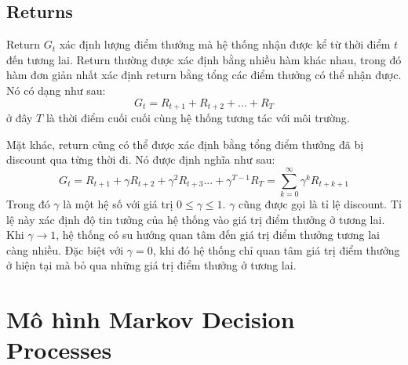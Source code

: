 \subsection{Returns}
Return $\mathit{G_t}$ xác định lượng điểm thưởng mà hệ thống nhận được kể từ thời điểm $t$ đến tương lai. Return thường được xác định bằng nhiều hàm khác nhau, trong đó hàm đơn giản nhất xác định return bằng tổng các điểm thưởng có thể nhận được. Nó có dạng như sau:
\begin{equation}
\mathit{G_t} = \mathit{R_{t+1}} + \mathit{R_{t+2}} + ... + \mathit{R_{T}}
\end{equation}	
ở đây $T$ là thời điểm cuối cuối cùng hệ thống tương tác với môi trường.

Mặt khác, return cũng có thể được xác định bằng tổng điểm thưởng đã bị discount qua từng thời đi. Nó được định nghĩa như sau:
\begin{equation}
\mathit{G_t} = \mathit{R_{t+1}} + \gamma\mathit{R_{t+2}} + \gamma^{2}\mathit{R_{t+3}}... + \gamma^{T-1}\mathit{R_{T}} = \sum_{k=0}^{\infty}\gamma^{k}\mathit{R_{t+k+1}}
\end{equation}
Trong đó $\gamma$ là một hệ số với giá trị $0\leqslant \gamma \leqslant 1$. $\gamma$ cũng được gọi là tỉ lệ discount. Tỉ lệ này xác định độ tin tưởng của hệ thống vào giá trị điểm thưởng ở tương lai. Khi $\gamma \to 1$, hệ thống có su hướng quan tâm đến giá trị điểm thưởng tương lai càng nhiều. Đặc biệt với $\gamma = 0$, khi đó hệ thống chỉ quan tâm giá trị điểm thưởng ở hiện tại mà bỏ qua những giá trị điểm thưởng ở tương lai.

\section{Mô hình Markov Decision Processes}
